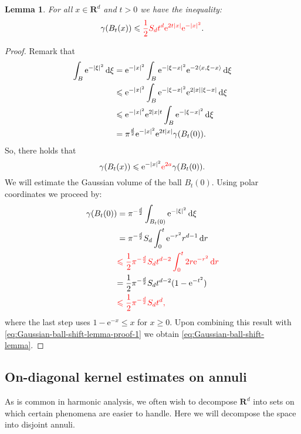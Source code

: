 \documentclass{amsart}
\newtheorem{lemma}{Lemma}
\theoremstyle{remark}
\newcommand{\D}{\,\textup{d}}
\newcommand{\la}{\langle}
\newcommand{\ra}{\rangle}
\renewcommand{\leq}{\leqslant}
\renewcommand{\leq}{\leqslant}
\newcommand{\R}{\mathbf R}
\newcommand{\e}{\mathrm{e}} %
\renewcommand{\leq}{\leqslant}%
\newcommand{\red}{\color{red}}
\begin{document}
\begin{lemma}\label{lem:Gaussian-ball-shift-lemma}
  For all $x\in\R^d$ and $t>0$ we have the inequality:
  \begin{equation}\label{eq:Gaussian-ball-shift-lemma}
    \gamma(B_t(x))\leq {\red  \frac12 S_d t^{d} \e^{2t|x|} \e^{-|x|^2}}. 
  \end{equation}
\end{lemma}
\begin{proof}
  Remark that
  \begin{align*}
    \int_B \e^{-|\xi|^2} \D\xi &= \e^{-|x|^2} \int_{B} \e^{-|\xi -
      x|^2} \e^{-2 \la x, \xi - x \ra} \D\xi\\
    &\leq \e^{-|x|^2} \int_{B} \e^{-|\xi - x|^2} \e^{2 |x| |\xi - x|}
    \D\xi\\
    &\leq \e^{-|x|^2} \e^{2 |x| t} \int_{B} \e^{-|\xi - x|^2} \D\xi\\
    &= \pi^{\frac{d}2} \e^{-|x|^2} \e^{2 t |x|} \gamma(B_t(0)).
  \end{align*}
  So, there holds that
  \begin{equation}\label{eq:Gaussian-ball-shift-lemma-proof-1}
    \gamma(B_t(x)) \leq \e^{-|x|^2} {\red \e^{2a}} \gamma(B_t(0)).
  \end{equation}
  We will estimate the Gaussian volume of the ball $B_t(0)$. Using polar coordinates
  we proceed by: 
  \begin{align*}
    \gamma(B_t(0)) &= \pi^{-\frac{d}2} \int_{B_t(0)} \e^{-|\xi|^2} \D\xi\\
    &=\pi^{-\frac{d}2}S_d \int_0^t \e^{-r^2} r^{d - 1} \D{r}\\
    & {\red \leq\frac12 \pi^{-\frac{d}2}S_d t^{d-2} \int_0^t 2r \e^{-r^2} \D{r}}\\
    & {= \frac12 \pi^{-\frac{d}2}S_d t^{d-2} (1-\e^{-t^2})} \\
    & {\red \leq \frac12 \pi^{-\frac{d}2}S_d t^{d},}
  \end{align*}
  where the last step uses $1-\e^{-x} \leq x$ for $x\ge 0$.
  Upon combining this result with
  \eqref{eq:Gaussian-ball-shift-lemma-proof-1} we obtain
  \eqref{eq:Gaussian-ball-shift-lemma}.
\end{proof}


\subsection{On-diagonal kernel estimates on annuli}
As is common in harmonic analysis, we often wish to decompose
$\R^d$ into sets on which certain phenomena are easier to handle. Here
we will decompose the space into disjoint annuli. 
\end{document}
